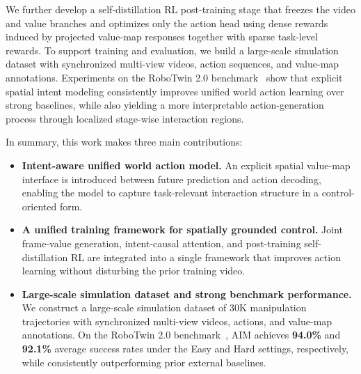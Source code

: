We further develop a self-distillation RL post-training stage that freezes the video and value branches and optimizes only the action head using dense rewards induced by projected value-map responses together with sparse task-level rewards. To support training and evaluation, we build a large-scale simulation dataset with synchronized multi-view videos, action sequences, and value-map annotations. Experiments on the RoboTwin 2.0 benchmark~\cite{robotwin2.0} show that explicit spatial intent modeling consistently improves unified world action learning over strong baselines, while also yielding a more interpretable action-generation process through localized stage-wise interaction regions.

In summary, this work makes three main contributions:
\begin{itemize}[leftmargin=*]
    \item \textbf{Intent-aware unified world action model.}
    An explicit spatial value-map interface is introduced between future prediction and action decoding, enabling the model to capture task-relevant interaction structure in a control-oriented form.

    \item \textbf{A unified training framework for spatially grounded control.}
    Joint frame-value generation, intent-causal attention, and post-training self-distillation RL are integrated into a single framework that improves action learning without disturbing the prior training video.

    \item \textbf{Large-scale simulation dataset and strong benchmark performance.}
    We construct a large-scale simulation dataset of 30K manipulation trajectories with synchronized multi-view videos, actions, and value-map annotations. On the RoboTwin 2.0 benchmark~\cite{robotwin2.0}, AIM achieves \textbf{94.0\%} and \textbf{92.1\%} average success rates under the Easy and Hard settings, respectively, while consistently outperforming prior external baselines.
\end{itemize}



